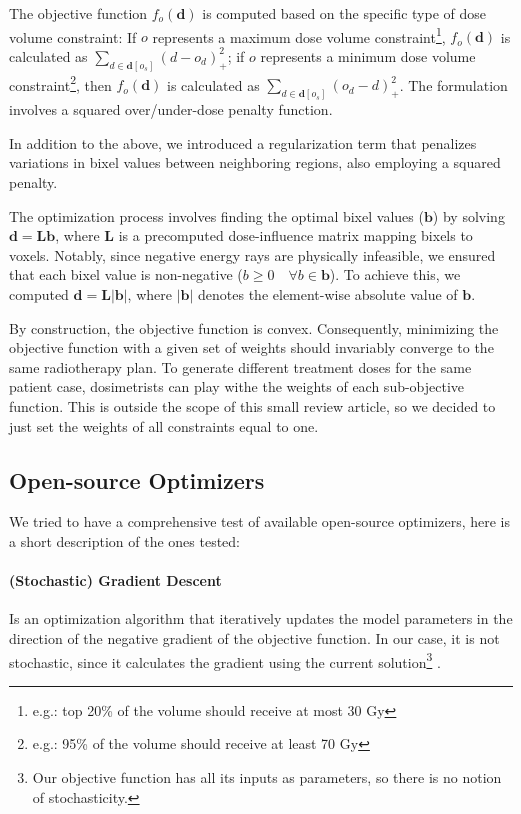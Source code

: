 \documentclass[a4paper]{article}
\newcommand{\abs}[1]{|{#1}|}
\begin{document}
	The objective function \(f_o(\mathbf{d})\) is computed based on the specific type of dose volume constraint:
	If \(o\) represents a maximum dose volume constraint\footnote{e.g.: top 20\% of the volume should receive at most 30 Gy}, \(f_o(\mathbf{d})\) is calculated as \(\sum_{d \in \mathbf{d}[o_s]}(d - o_d)_+^2\); if \(o\) represents a minimum dose volume constraint\footnote{e.g.: 95\% of the volume should receive at least 70 Gy}, then \(f_o(\mathbf{d})\) is calculated as \(\sum_{d \in \mathbf{d}[o_s]}(o_d - d)_+^2\).
	The formulation involves a squared over/under-dose penalty function.
	
	In addition to the above, we introduced a regularization term that penalizes variations in bixel values between neighboring regions, also employing a squared penalty.
	
	The optimization process involves finding the optimal bixel values (\(\mathbf{b}\)) by solving \(\mathbf{d} = \mathbf{L}\mathbf{b}\), where \(\mathbf{L}\) is a precomputed dose-influence matrix mapping bixels to voxels.
	Notably, since negative energy rays are physically infeasible, we ensured that each bixel value is non-negative (\(b \geq 0 \quad \forall b \in \mathbf{b}\)).
	To achieve this, we computed \(\mathbf{d} = \mathbf{L}\abs{\mathbf{b}}\), where \(\abs{\mathbf{b}}\) denotes the element-wise absolute value of \(\mathbf{b}\).
	
	By construction, the objective function is convex.
	Consequently, minimizing the objective function with a given set of weights should invariably converge to the same radiotherapy plan.
	To generate different treatment doses for the same patient case, dosimetrists can play withe the weights of each sub-objective function.
	This is outside the scope of this small review article, so we decided to just set the weights of all constraints equal to one.
	
	\subsection{Open-source Optimizers}
	We tried to have a comprehensive test of available open-source optimizers, here is a short description of the ones tested:
	
	\paragraph{(Stochastic) Gradient Descent}
	Is an optimization algorithm that iteratively updates the model parameters in the direction of the negative gradient of the objective function.
	In our case, it is not stochastic, since it calculates the gradient using the current solution\footnote{Our objective function has all its inputs as parameters, so there is no notion of stochasticity.} \cite{Lemarechal2012}.
\end{document}
